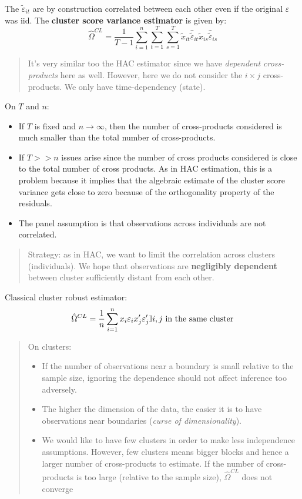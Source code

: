 \documentclass[12pt,]{book}
\providecommand{\tightlist}{%
  \setlength{\itemsep}{0pt}\setlength{\parskip}{0pt}}
\begin{document}
The \(\tilde{\varepsilon} _ {it}\) are by construction correlated between each other even if the original \(\varepsilon\) was iid. The \textbf{cluster score variance estimator} is given by:
\[
  \hat{\Omega}^{CL} = \frac{1}{T-1} \sum _ {i=1}^n  \sum _ {t=1}^T  \sum _ {s=1}^T \tilde{x} _ {it} \hat{\tilde{\varepsilon}} _ {it} \tilde{x} _ {is}     \hat{\tilde{\varepsilon}} _ {is}
\]

\begin{quote}
It's very similar too the HAC estimator since we have \emph{dependent cross-products} here as well. However, here we do not consider the \(i \times j\) cross-products. We only have time-dependency (state).
\end{quote}

On \(T\) and \(n\):

\begin{itemize}
\tightlist
\item
  If \(T\) is fixed and \(n \to \infty\), then the number of cross-products considered is much smaller than the total number of cross-products.
\item
  If \(T >> n\) issues arise since the number of cross products considered is close to the total number of cross products. As in HAC estimation, this is a problem because it implies that the algebraic estimate of the cluster score variance gets close to zero because of the orthogonality property of the residuals.
\item
  The panel assumption is that observations across individuals are not correlated.
\end{itemize}

\begin{quote}
Strategy: as in HAC, we want to limit the correlation across clusters (individuals). We hope that observations are \textbf{negligibly dependent} between cluster sufficiently distant from each other.
\end{quote}

Classical cluster robust estimator:
\[
  \hat{\Omega}^{CL} = \frac{1}{n} \sum _ {i=1}^n x_i \varepsilon_i x_j' \varepsilon_j' \mathbb{I}   \\{ i,j \text{ in the same cluster} \\}
\]

\begin{quote}
On clusters:

\begin{itemize}
\tightlist
\item
  If the number of observations near a boundary is small relative to the sample size, ignoring the dependence should not affect inference too adversely.
\item
  The higher the dimension of the data, the easier it is to have observations near boundaries (\emph{curse of dimensionality}).
\item
  We would like to have few clusters in order to make less independence assumptions. However, few clusters means bigger blocks and hence a larger number of cross-products to estimate. If the number of cross-products is too large (relative to the sample size), \(\hat{\Omega}^{CL}\) does not converge
\end{itemize}
\end{quote}
\end{document}
